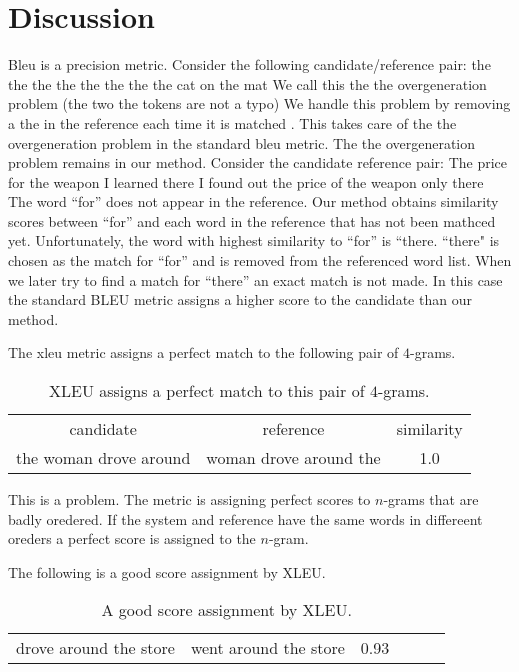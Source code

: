 
\section{Discussion}
\label{sec:discuss}

Bleu is a precision metric. 
Consider the following candidate/reference pair:
the the the the the the the 
the cat on the mat
We call this the  the overgeneration problem (the two the tokens are not a typo)
We handle this problem by removing a the in the reference each time it is matched . 
This takes care of the the overgeneration problem in the standard bleu metric. 
The the overgeneration problem remains in our method. 
Consider the candidate reference pair:
The price for the weapon I learned there
I found out the price of the weapon only there
The word ``for'' does not appear in the reference. 
Our method obtains similarity scores between ``for'' and each word in the reference that has not been mathced yet. 
Unfortunately, the word with highest similarity to ``for'' is ``there. 
``there" is chosen as the match for ``for'' and is removed from the referenced word list. 
When we later try to find a match for ``there'' an exact match is not made. 
In this case the standard BLEU metric assigns a higher score to the candidate than our method. 

The xleu metric assigns a perfect match to the following pair of $4$-grams. 
\begin{table}[h]
  \centering
  \begin{tabular}{|c|c|c|}
    candidate & reference & similarity \\
the woman drove around & woman drove around the & 1.0 
  \end{tabular}
  \caption{XLEU assigns a perfect match to this pair of $4$-grams.}
  \label{tab:perfect}
\end{table}

This is a problem. 
The metric is assigning perfect scores to $n$-grams that are  badly oredered. 
If the system and reference have the same words in differeent oreders a perfect score is assigned to the $n$-gram.

The following is a good score assignment by XLEU.
\begin{table}[hh]
  \centering
  \begin{tabular}{|c|c|c||c|c|c|}
    drove around the store & went around the store & 0.93 
  \end{tabular}
  \caption{A good score assignment by XLEU.}
  \label{tab:good}
\end{table}
